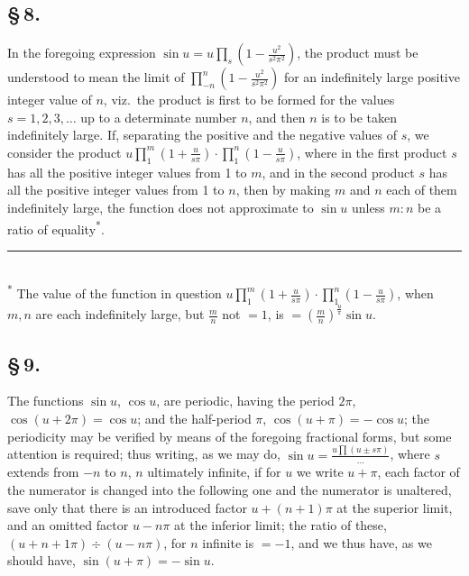 \documentclass[11pt,a4paper]{article}
\begin{document}
\subsection*{\S\,8.}

In the foregoing expression $\sin u = u\prod_{s}(1 - \frac{u^{2}}{s^{2}\pi^{2}})$, the product must be understood to mean the limit of $\prod_{-n}^{n}(1 - \frac{u^{2}}{s^{2}\pi^{2}})$ for an indefinitely large positive integer value of $n$, viz.\ the product is first to be formed for the values $s = 1, 2, 3, \ldots$ up to a determinate number $n$, and then $n$ is to be taken indefinitely large. If, separating the positive and the negative values of $s$, we consider the product $u\prod_{1}^{m}(1 + \frac{u}{s\pi}) \cdot \prod_{1}^{n}(1 - \frac{u}{s\pi})$, where in the first product $s$ has all the positive integer values from 1 to $m$, and in the second product $s$ has all the positive integer values from 1 to $n$, then by making $m$ and $n$ each of them indefinitely large, the function does not approximate to $\sin u$ unless $m : n$ be a ratio of equality\textsuperscript{*}.

\smallskip
\small\noindent\rule{0.4\textwidth}{0.4pt}\\
\textsuperscript{*} The value of the function in question $u\prod_{1}^{m}(1 + \frac{u}{s\pi}) \cdot \prod_{1}^{n}(1 - \frac{u}{s\pi})$, when $m, n$ are each indefinitely large, but $\frac{m}{n}$ not $= 1$, is $= \left(\frac{m}{n}\right)^{\frac{u}{\pi}}\sin u$.
\normalsize

\subsection*{\S\,9.}

The functions $\sin u$, $\cos u$, are periodic, having the period $2\pi$, $\cos(u + 2\pi) = \cos u$; and the half-period $\pi$, $\cos(u + \pi) = -\cos u$; the periodicity may be verified by means of the foregoing fractional forms, but some attention is required; thus writing, as we may do, $\sin u = \frac{u\prod(u \pm s\pi)}{\ldots}$, where $s$ extends from $-n$ to $n$, $n$ ultimately infinite, if for $u$ we write $u + \pi$, each factor of the numerator is changed into the following one and the numerator is unaltered, save only that there is an introduced factor $u + (n + 1)\pi$ at the superior limit, and an omitted factor $u - n\pi$ at the inferior limit; the ratio of these, $(u + n + 1\pi) \div (u - n\pi)$, for $n$ infinite is $= -1$, and we thus have, as we should have, $\sin(u + \pi) = -\sin u$.
\end{document}
